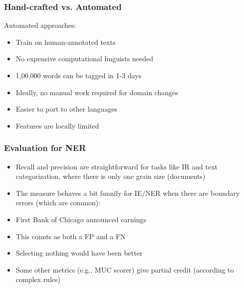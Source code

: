 \begin{frame}[fragile]\frametitle{Hand-crafted vs. Automated }
Automated approaches:
  \begin{itemize}
  \item Train on human-annotated texts
  \item No expensive computational linguists needed
  \item 1,00,000 words can be tagged in 1-3 days
  \item Ideally, no manual work required for domain changes
  \item Easier to port to other languages
  \item Features are locally limited
  \end{itemize}
\end{frame}

\begin{frame}[fragile]\frametitle{Evaluation for NER }
  \begin{itemize}
  \item Recall and precision are straightforward for tasks like IR and text 
categorization, where there is only one grain size (documents)
  \item The measure behaves a bit funnily for IE/NER when there are 
boundary errors (which are common):
  \item First Bank of Chicago announced earnings
  \item This counts as both a FP and a FN
  \item Selecting nothing would have been better
  \item Some other metrics (e.g., MUC scorer) give partial credit (according to complex rules)
  \end{itemize}
\end{frame}
